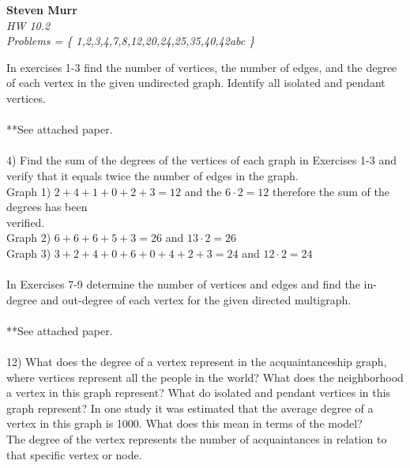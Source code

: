 \documentclass{article}
\begin{document}
\setcounter{totalnumber}{5}
   \begin{flushright}
      \Large\textbf{Steven Murr}\\
      \large\textit{HW 10.2} \\
      \large\textit{ Problems = \{ 1,2,3,4,7,8,12,20,24,25,35,40,42abc \} }
   \end{flushright}
\begin{flushleft}
\makeatletter%
\setlength{\@fptop}{5pt}
\makeatother

\setlength\parindent{0pt}In exercises 1-3 find the number of vertices, the number of edges, and the degree of each vertex in the given undirected graph.  Identify all isolated and pendant vertices. \\
~\\
**See attached paper. \\
~\\
\setlength\parindent{0pt}4) Find the sum of the degrees of the vertices of each graph in Exercises 1-3 and verify that it equals twice the number of edges in the graph. \\
\setlength\parindent{24pt}Graph 1) $2+4+1+0+2+3 = 12$ and the $6 \cdot 2 = 12$ therefore the sum of the degrees has been \\verified. \\
\setlength\parindent{24pt}Graph 2) $6+6+6+5+3 = 26$ and $13 \cdot 2 = 26$ \\
\setlength\parindent{24pt}Graph 3) $3+2+4+0+6+0+4+2+3 = 24$ and $12 \cdot 2 = 24$ \\
~\\
\setlength\parindent{0pt} In Exercises 7-9 determine the number of vertices and edges and find the in-degree and out-degree of each vertex for the given directed multigraph. \\
~\\
**See attached paper. \\
~\\
\setlength\parindent{0pt}12) What does the degree of a vertex represent in the acquaintanceship graph, where vertices represent all the people in the world?  What does the neighborhood a vertex in this graph represent?  What do isolated and pendant vertices in this graph represent?  In one study it was estimated that the average degree of a vertex in this graph is 1000.  What does this mean in terms of the model? \\
\setlength\parindent{24pt} The degree of the vertex represents the number of acquaintances in relation to that specific vertex or node. \\

\end{flushleft}
\end{document}
